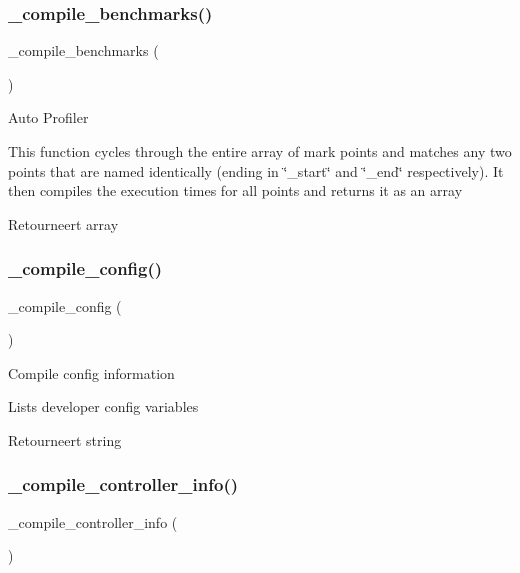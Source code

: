 \subsubsection{\texorpdfstring{\_compile\_benchmarks()}{\_compile\_benchmarks()}}
{\footnotesize\ttfamily \+\_\+compile\+\_\+benchmarks (\begin{DoxyParamCaption}{ }\end{DoxyParamCaption})\hspace{0.3cm}{\ttfamily [protected]}}

Auto Profiler

This function cycles through the entire array of mark points and matches any two points that are named identically (ending in \char`\"{}\+\_\+start\char`\"{} and \char`\"{}\+\_\+end\char`\"{} respectively). It then compiles the execution times for all points and returns it as an array

\begin{DoxyReturn}{Retourneert}
array 
\end{DoxyReturn}
\mbox{\label{class_c_i___profiler_affb7543f1c67a5b3ff24eaefcec37e6d}} 
\subsubsection{\texorpdfstring{\_compile\_config()}{\_compile\_config()}}
{\footnotesize\ttfamily \+\_\+compile\+\_\+config (\begin{DoxyParamCaption}{ }\end{DoxyParamCaption})\hspace{0.3cm}{\ttfamily [protected]}}

Compile config information

Lists developer config variables

\begin{DoxyReturn}{Retourneert}
string 
\end{DoxyReturn}
\mbox{\label{class_c_i___profiler_a46a079522432af283c844f043ba5a513}} 
\subsubsection{\texorpdfstring{\_compile\_controller\_info()}{\_compile\_controller\_info()}}
{\footnotesize\ttfamily \+\_\+compile\+\_\+controller\+\_\+info (\begin{DoxyParamCaption}{ }\end{DoxyParamCaption})\hspace{0.3cm}{\ttfamily [protected]}}


